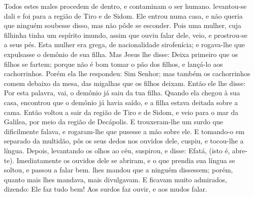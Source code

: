 {  Todos estes males procedem de dentro, e contaminam o ser humano.
   levantou-se dali e foi para a região de Tiro e de Sidom. Ele entrou numa casa, e não queria que ninguém soubesse disso, mas não pôde se esconder.
  Pois uma mulher, cuja filhinha tinha um espírito imundo, assim que ouviu falar dele, veio, e prostrou-se a seus pés.
  Esta mulher era grega, de nacionalidade sirofenícia; e rogava-lhe que expulsasse o demônio de sua filha.
  Mas Jesus lhe disse: Deixa primeiro que os filhos se fartem; porque não é bom tomar o pão dos filhos, e lançá-lo aos cachorrinhos.
  Porém ela lhe respondeu: Sim Senhor; mas também os cachorrinhos comem debaixo da mesa, das migalhas que os filhos deixam.
  Então ele lhe disse: Por esta palavra, vai, o demônio já saiu da tua filha.
  Quando ela chegou à sua casa, encontrou que o demônio já havia saído, e a filha estava deitada sobre a cama.
  Então
{} voltou a sair da região de Tiro e de Sidom, e veio para o mar da Galilea, por meio da região de Decápolis.
  E trouxeram-lhe um surdo que dificilmente falava, e rogaram-lhe que pusesse a mão sobre ele.
  E tomando-o em separado da multidão, pôs os seus dedos nos ouvidos dele, cuspiu, e tocou-lhe a língua.
  Depois, levantando os olhos ao céu, suspirou, e disse: Efatá, (isto é, abre-te).
  Imediatamente os ouvidos dele se abriram, e o que prendia sua língua se soltou, e passou a falar bem.
   lhes mandou que a ninguém dissessem; porém, quanto mais lhes mandava, mais divulgavam.
  E ficavam muito admirados, dizendo: Ele faz tudo bem! Aos surdos faz ouvir, e aos mudos falar.
\par }

